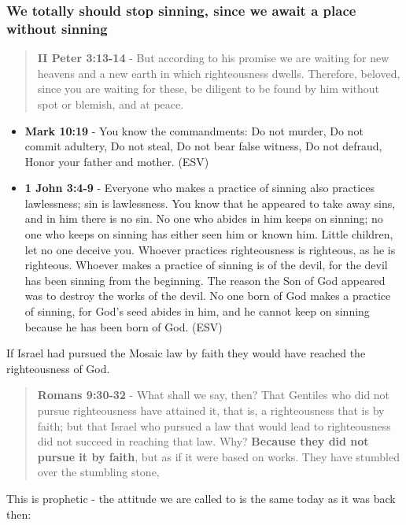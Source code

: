 \documentclass[11pt]{article}
\begin{document}
\subsubsection{We totally \textbf{should} stop sinning, since we await a place without sinning}
\label{sec:orgc066d1d}

\begin{quote}
\textbf{II Peter 3:13-14} - But according to his promise we are waiting for new heavens and a new earth in which righteousness dwells. Therefore, beloved, since you are waiting for these, be diligent to be found by him without spot or blemish, and at peace.
\end{quote}

\begin{itemize}
\item \textbf{Mark 10:19} - You know the commandments: Do not murder, Do not commit adultery, Do not steal, Do not bear false witness, Do not defraud, Honor your father and mother. (ESV)
\item \textbf{1 John 3:4-9} - Everyone who makes a practice of sinning also practices lawlessness; sin is lawlessness.  You know that he appeared to take away sins, and in him there is no sin.  No one who abides in him keeps on sinning; no one who keeps on sinning has either seen him or known him.  Little children, let no one deceive you.  Whoever practices righteousness is righteous, as he is righteous.  Whoever makes a practice of sinning is of the devil, for the devil has been sinning from the beginning.  The reason the Son of God appeared was to destroy the works of the devil.  No one born of God makes a practice of sinning, for God's seed abides in him, and he cannot keep on sinning because he has been born of God.  (ESV)
\end{itemize}

If Israel had pursued the Mosaic law by faith they would have reached the righteousness of God.

\begin{quote}
\textbf{Romans 9:30-32} - What shall we say, then? That Gentiles who did not pursue righteousness have attained it, that is, a righteousness that is by faith; but that Israel who pursued a law that would lead to righteousness did not succeed in reaching that law.  Why? \textbf{Because they did not pursue it by faith}, but as if it were based on works. They have stumbled over the stumbling stone,
\end{quote}

This is prophetic - the attitude we are called to is the same today as it was back then:
\end{document}
